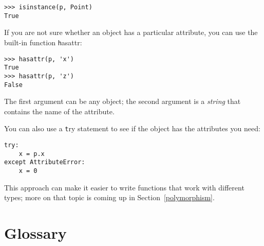 \documentclass[
DIV=11,
fontsize=13,
twoside,
headinclude=false,
titlepage=firstiscover,
abstract=true,
headsepline=true,
footsepline=true,
chapterprefix=true, %
headings=big,
bibliography=totoc,%
captions=tableheading
]{scrbook}
\theoremstyle{definition}
\begin{document}
\begin{lstlisting}
>>> isinstance(p, Point)
True
\end{lstlisting}
%
If you are not sure whether an object has a particular attribute,
you can use the built-in function {\texttt hasattr}:

\begin{lstlisting}
>>> hasattr(p, 'x')
True
>>> hasattr(p, 'z')
False
\end{lstlisting}
%
The first argument can be any object; the second argument is a {\em
string} that contains the name of the attribute.

You can also use a {\texttt try} statement to see if the object has the
attributes you need:

\begin{lstlisting}
try:
    x = p.x
except AttributeError:
    x = 0
\end{lstlisting}

This approach can make it easier to write functions that work with
different types; more on that topic is
coming up in Section~\ref{polymorphism}.


\section{Glossary}
\end{document}
